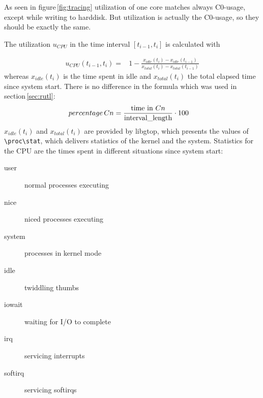 

\superpar
As seen in figure\,\ref{fig:tracing} utilization of one core matches always C0-usage, except while writing to harddisk. But utilization is actually the C0-usage, so they should be exactly the same.

The utilization $u_{CPU}$ in the time interval $[t_{i-1}, t_i]$ is calculated with

%
\begin{align*}
u_{CPU}(t_{i-1}, t_i) =& 1-\frac{x_{idle}(t_i) - x_{idle}(t_{i-1})}{x_{total}(t_i) - x_{total}(t_{i-1})}
\end{align*}
%
whereas $x_{idle}(t_i)$ is the time spent in idle and $x_{total}(t_i)$ the total elapsed time since system start\cite{krempel}. There is no difference in the formula which was used in section\,\ref{sec:rutl}:
%
\begin{align*}
percentage\,Cn &=  \frac{\text{time in } Cn}{\text{\lstinline!interval_length!}} \cdot 100
\end{align*}
%
$x_{idle}(t_i)$ and $x_{total}(t_i)$ are provided by libgtop\cite{libgtop}, which presents the values of \lstinline!\proc\stat!, which delivers statistics of the kernel and the system. Statistics for the CPU are the times spent in different situations since system start:

%
\begin{multicols}{2}
\begin{description}
\item[user] normal processes executing
\item[nice] niced processes executing
\item[system] processes in kernel mode
\item[idle] twiddling thumbs
\item[iowait] waiting for I/O to complete
\item[irq] servicing interrupts
\item[softirq] servicing softirqs
\end{description}
\end{multicols}
%

